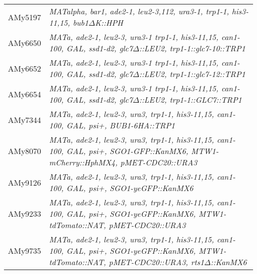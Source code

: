 \begin{longtable}{p{}p{}}
AMy5197         & \textit{MATalpha, bar1, ade2-1,   leu2-3,112, ura3-1, trp1-1, his3-11,15, bub1$\Delta$K::HPH}                                                                                                                                                                 \\
AMy6650         & \textit{MATa, ade2-1, leu2-3, ura3-1   trp1-1, his3-11,15, can1-100, GAL, ssd1-d2, glc7$\Delta$::LEU2,   trp1-1::glc7-10::TRP1}                                                                                                                               \\
AMy6652         & \textit{MATa, ade2-1, leu2-3, ura3-1   trp1-1, his3-11,15, can1-100, GAL, ssd1-d2, glc7$\Delta$::LEU2,   trp1-1::glc7-12::TRP1}                                                                                                                               \\
AMy6654         & \textit{MATa, ade2-1, leu2-3, ura3-1   trp1-1, his3-11,15, can1-100, GAL, ssd1-d2, glc7$\Delta$::LEU2, trp1-1::GLC7::TRP1}                                                                                                                                    \\
AMy7344         & \textit{MATa, ade2-1, leu2-3, ura3,   trp1-1, his3-11,15, can1-100, GAL, psi+, BUB1-6HA::TRP1}                                                                                                                                                         \\
AMy8070         & \textit{MATa, ade2-1, leu2-3, ura3,   trp1-1, his3-11,15, can1-100, GAL, psi+, SGO1-GFP::KanMX6,   MTW1-mCherry::HphMX4, pMET-CDC20::URA3}                                                                                                             \\
AMy9126         & \textit{MATa, ade2-1, leu2-3, ura3,   trp1-1, his3-11,15, can1-100, GAL, psi+, SGO1-yeGFP::KanMX6}                                                                                                                                                     \\
AMy9233         & \textit{MATa, ade2-1, leu2-3, ura3,   trp1-1, his3-11,15, can1-100, GAL, psi+, SGO1-yeGFP::KanMX6,   MTW1-tdTomato::NAT, pMET-CDC20::URA3}                                                                                                             \\
AMy9735         & \textit{MATa, ade2-1, leu2-3, ura3,   trp1-1, his3-11,15, can1-100, GAL, psi+, SGO1-yeGFP::KanMX6,   MTW1-tdTomato::NAT, pMET-CDC20::URA3, rts1$\Delta$::KanMX6}                                                                                              \\

\end{longtable}
